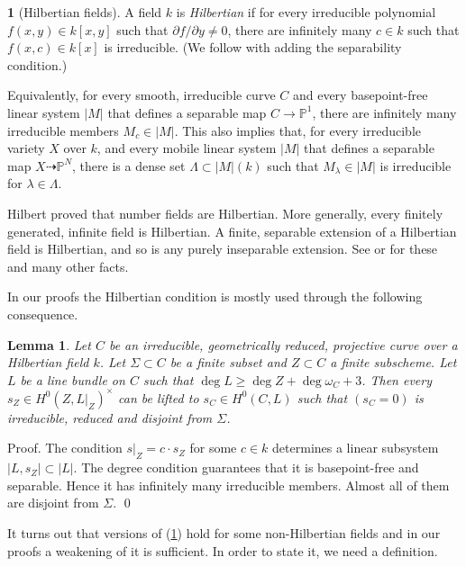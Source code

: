 \documentclass{amsart}
\newtheorem{lem}[thm]{Lemma}
\theoremstyle{definition}
\newtheorem{say}[thm]{}
\theoremstyle{remark}
\newcommand{\p}[0]{{\mathbb P}}
\newcommand{\map}[0]{\dasharrow}
\begin{document}
\begin{say}[Hilbertian fields]\label{hilb.field.say}
 A field $k$ is {\it Hilbertian} if
for every irreducible polynomial  $f(x,y)\in k[x,y]$ such that
$\partial f/\partial y\neq 0$, there are  infinitely many $c\in k$ such that $f(x,c)\in k[x]$ is irreducible. (We follow \cite[Chap.12]{fri-jar} with adding the separability condition.)

Equivalently, for every smooth, irreducible curve $C$ and every 
basepoint-free linear system $|M|$ that defines a separable map $C\to \p^1$, there are 
 infinitely many  irreducible members $M_c\in |M|$. 
This also implies that,  for every irreducible variety $X$ over $k$, and every 
mobile linear system $|M|$  that defines a separable map $X\map \p^N$, there is a dense set
$\Lambda\subset |M|(k)$ such that $M_\lambda\in |M|$
is  irreducible for $\lambda\in \Lambda$. 


Hilbert proved that number fields are  Hilbertian. More generally, 
 every finitely generated, infinite field is Hilbertian.
A finite, separable extension of a Hilbertian field is Hilbertian, and so is any purely inseparable extension. 
 See \cite[Chap.VIII]{MR0142550} or \cite[Chaps.12--13]{fri-jar} for these and many other facts.  
\end{say}


In our proofs the Hilbertian condition is mostly used through the following consequence. 


\begin{lem}\label{hilb.f.basic.prop.lem.2}  Let $C$ be an irreducible,  geometrically reduced,   projective curve  over a Hilbertian  field $k$. Let $\Sigma\subset C$ be a finite subset and  $Z\subset C$ a finite subscheme. Let $L$ be a  line bundle on $C$  such that $\deg L\geq \deg Z+\deg \omega_C+3$.   
Then every $s_Z\in H^0(Z, L|_Z)^\times$ can be lifted to   $s_C\in H^0(C, L)$
such that $(s_C=0)$ is irreducible, reduced  and disjoint from $\Sigma$. 
\end{lem}




Proof. The condition $s|_Z=c\cdot s_Z$ for some $c\in k$ determines a linear subsystem  $|L, s_Z|\subset |L|$. The degree condition guarantees that it is basepoint-free and separable. Hence it has infinitely many irreducible members. Almost all of them are disjoint from $\Sigma$. \qed







\medskip
It turns out that  versions of  (\ref{hilb.f.basic.prop.lem.2}) hold for some  non-Hilbertian fields and 
in our  proofs  a  weakening of 
it  is sufficient.   In order to state it, we need a definition.
\end{document}
